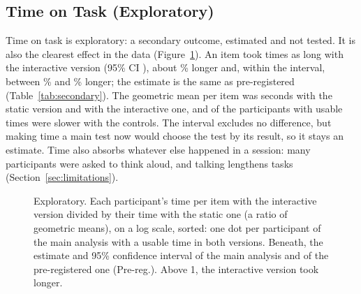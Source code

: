 \documentclass[10pt,twocolumn]{article}
\begin{document}
\subsection{Time on Task (Exploratory)}
\label{sec:time}

Time on task is exploratory: a secondary outcome, estimated and not tested. It is also the clearest effect in the data (Figure~\ref{fig:time}). An item took  times as long with the interactive version (95\% CI ), about \% longer and, within the interval, between \% and \% longer; the estimate is the same as pre-registered (Table~\ref{tab:secondary}). The geometric mean per item was  seconds with the static version and  with the interactive one, and  of the  participants with usable times were slower with the controls. The interval excludes no difference, but making time a main test now would choose the test by its result, so it stays an estimate. Time also absorbs whatever else happened in a session: many participants were asked to think aloud, and talking lengthens tasks~\cite{fox2011} (Section~\ref{sec:limitations}).

\begin{table}[t]
    \centering
    \footnotesize
    
    \caption{
        The pre-registered secondary outcomes, interactive minus static (time as a ratio), each with its 95\% confidence interval, in the main analysis and as pre-registered. They are estimates, not tests of the hypotheses: none is corrected for multiplicity, and none can be called significant, whatever its $p$.
    }
    \label{tab:secondary}
\end{table}

\begin{figure}[t]
    \centering
    
    \caption{
        Exploratory. Each participant's time per item with the interactive version divided by their time with the static one (a ratio of geometric means), on a log scale, sorted: one dot per participant of the main analysis with a usable time in both versions. Beneath, the estimate and 95\% confidence interval of the main analysis and of the pre-registered one (Pre-reg.). Above 1, the interactive version took longer.
    }
    \label{fig:time}
\end{figure}
\end{document}
